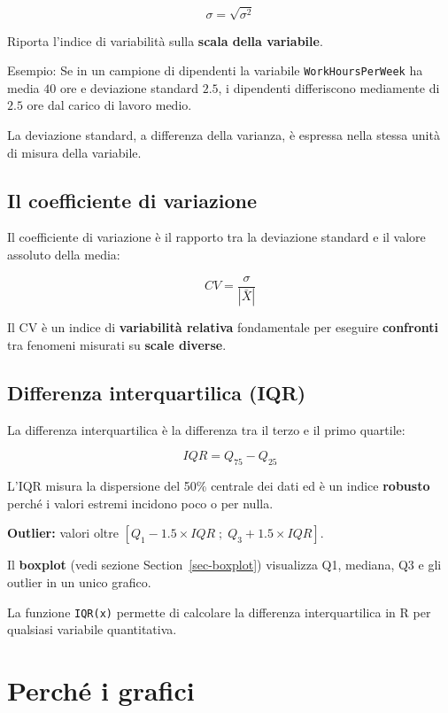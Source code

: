 \documentclass[
  a4paper,
  DIV=11,
  numbers=noendperiod]{scrreprt}
\begin{document}
\[\sigma = \sqrt{\sigma^2}\]

Riporta l'indice di variabilità sulla \textbf{scala della variabile}.

Esempio: Se in un campione di dipendenti la variabile
\texttt{WorkHoursPerWeek} ha media \(40\) ore e deviazione standard
\(2.5\), i dipendenti differiscono mediamente di \(2.5\) ore dal carico
di lavoro medio.

La deviazione standard, a differenza della varianza, è espressa nella
stessa unità di misura della variabile.

\subsection{Il coefficiente di
variazione}\label{il-coefficiente-di-variazione}

Il coefficiente di variazione è il rapporto tra la deviazione standard e
il valore assoluto della media:

\[CV = \frac{\sigma}{|\bar{X}|}\]

Il CV è un indice di \textbf{variabilità relativa} fondamentale per
eseguire \textbf{confronti} tra fenomeni misurati su \textbf{scale
diverse}.

\subsection{Differenza interquartilica
(IQR)}\label{differenza-interquartilica-iqr}

La differenza interquartilica è la differenza tra il terzo e il primo
quartile:

\[IQR = Q_{75} - Q_{25}\]

L'IQR misura la dispersione del 50\% centrale dei dati ed è un indice
\textbf{robusto} perché i valori estremi incidono poco o per nulla.

\textbf{Outlier:} valori oltre
\([Q_1 - 1.5 \times IQR \;;\; Q_3 + 1.5 \times IQR]\).

Il \textbf{boxplot} (vedi sezione Section~\ref{sec-boxplot}) visualizza
Q1, mediana, Q3 e gli outlier in un unico grafico.

La funzione \texttt{IQR(x)} permette di calcolare la differenza
interquartilica in R per qualsiasi variabile quantitativa.

\section{Perché i grafici}\label{perchuxe9-i-grafici}
\end{document}
